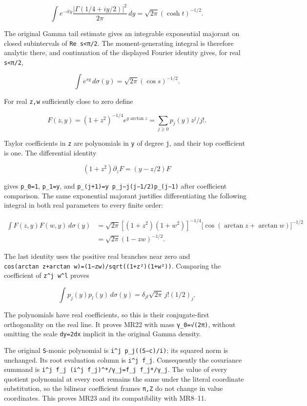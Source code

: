 \documentclass[11pt]{article}
\begin{document}
\[
\int e^{-ity}\frac{|\Gamma(1/4+iy/2)|^2}{2\pi}\,dy
=\sqrt{2\pi}(\cosh t)^{-1/2}.
\]

The original Gamma tail estimate gives an integrable exponential majorant on closed subintervals of \texttt{\textbar{}Re\ s\textbar{}\textless{}π/2}. The moment-generating integral is therefore analytic there, and continuation of the displayed Fourier identity gives, for real \texttt{\textbar{}s\textbar{}\textless{}π/2},

\[
\int e^{sy}\,d\sigma(y)=\sqrt{2\pi}(\cos s)^{-1/2}.
\]

For real \texttt{z,w} sufficiently close to zero define

\[
F(z,y)=(1+z^2)^{-1/4}e^{y\arctan z}
=\sum_{j\ge0}p_j(y)z^j/j!.
\]

Taylor coefficients in \texttt{z} are polynomials in \texttt{y} of degree \texttt{j}, and their top coefficient is one. The differential identity

\[
(1+z^2)\partial_z F=(y-z/2)F
\]

gives \texttt{p\_0=1}, \texttt{p\_1=y}, and \texttt{p\_(j+1)=y\ p\_j−j(j−1/2)p\_(j−1)} after coefficient comparison. The same exponential majorant justifies differentiating the following integral in both real parameters to every finite order:

\[
\begin{aligned}
\int F(z,y)F(w,y)\,d\sigma(y)
&=\sqrt{2\pi}[(1+z^2)(1+w^2)]^{-1/4}
\bigl[\cos(\arctan z+\arctan w)\bigr]^{-1/2}\\
&=\sqrt{2\pi}(1-zw)^{-1/2}.
\end{aligned}
\]

The last identity uses the positive real branches near zero and \texttt{cos(arctan\ z+arctan\ w)=(1−zw)/sqrt((1+z²)(1+w²))}. Comparing the coefficient of \texttt{z\^{}j\ w\^{}l} proves

\[
\int p_j(y)p_l(y)\,d\sigma(y)
=\delta_{jl}\sqrt{2\pi}\,j!(1/2)_j.
\]

The polynomials have real coefficients, so this is their conjugate-first orthogonality on the real line. It proves MR22 with mass \texttt{γ\_0=√(2π)}, without omitting the scale \texttt{dy=2dx} implicit in the original Gamma density.

The original \texttt{S}-monic polynomial is \texttt{i\^{}j\ p\_j((S−c)/i)}; its squared norm is unchanged. Its root evaluation column is \texttt{i\^{}j\ f\_j}. Consequently the covariance summand is \texttt{i\^{}j\ f\_j\ (i\^{}j\ f\_j)\^{}*/γ\_j=f\_j\ f\_j*/γ\_j}. The value of every quotient polynomial at every root remains the same under the literal coordinate substitution, so the bilinear coefficient frames \texttt{π,Z} do not change in value coordinates. This proves MR23 and its compatibility with MR8--11.
\end{document}
